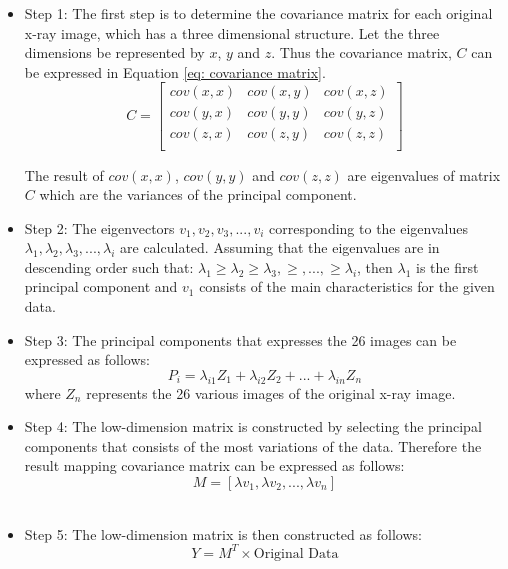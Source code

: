 \documentclass[11pt,twocolumn]{witseiepaper}
\begin{document}
	\begin{itemize}
		\item Step 1: The first step is to determine the covariance matrix for each original x-ray image, which has a three dimensional structure. Let the three dimensions be represented by $x$, $y$ and $z$. Thus the covariance matrix, $C$ can be expressed in Equation \ref{eq: covariance matrix}.
		\begin{equation}
		\label{eq: covariance matrix}
		C = 
		\begin{bmatrix}
		cov(x,x) & cov(x,y) & cov(x,z) \\
		cov(y,x) & cov(y,y) & cov(y,z) \\
		cov(z,x) & cov(z,y) & cov(z,z) \\
		\end{bmatrix}
		\end{equation}
		
		The result of $cov(x,x)$, $cov(y,y)$ and $cov(z,z)$ are eigenvalues of matrix $C$ which are the variances of the principal component.\\
		\item Step 2: The eigenvectors $v_1, v_2, v_3, ... , v_i$ corresponding to the eigenvalues $\lambda_1, \lambda_2, \lambda_3, ... , \lambda_i$ are calculated. Assuming that the eigenvalues are in descending order such that: $\lambda_1 \geq \lambda_2 \geq \lambda_3, \geq, ...,\geq \lambda_i$, then $\lambda_1$ is the first principal component and $v_1$ consists of the main characteristics for the given data. \\
		\item Step 3: The principal components that expresses the 26 images can be expressed as follows:
		\begin{equation}
		P_i = \lambda_{i1}Z_1 + \lambda_{i2}Z_2 + ... + \lambda_{in}Z_n
		\end{equation} 
		where $Z_n$ represents the 26 various images of the original x-ray image. \\
		\item Step 4: The low-dimension matrix is constructed by selecting the principal components that consists of the most variations of the data. Therefore the result mapping covariance matrix can be expressed as follows: 
		\begin{equation}
		M = [\lambda v_1, \lambda v_2, ... , \lambda v_n]
		\end{equation} \\
		\item Step 5: The low-dimension matrix is then constructed as follows:
		\begin{equation}
		Y = M^T \times \text{Original Data}
		\end{equation}
	\end{itemize}
	
\end{document}
